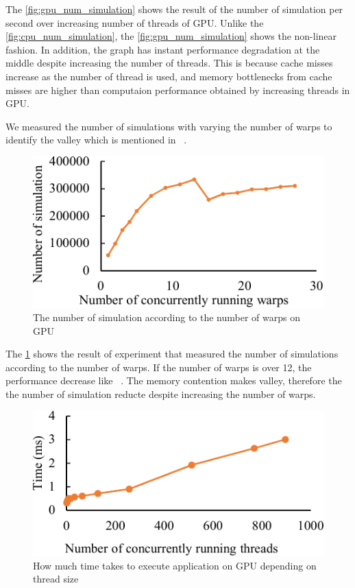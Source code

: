 The \cref{fig:gpu_num_simulation} shows the result of the number of simulation per second over increasing number of threads of GPU. 
Unlike the \cref{fig:cpu_num_simulation}, the \cref{fig:gpu_num_simulation} shows the non-linear fashion. 
In addition, the graph has instant performance degradation at the middle despite increasing the number of threads. 
This is because cache misses increase as the number of thread is used, and memory bottlenecks from cache misses are higher than computaion performance obtained by increasing threads in GPU.

We measured the number of simulations with varying the number of warps to identify the valley which is mentioned in ~\cite{li2015priority_valley}. 
\begin{figure}
\includegraphics[width=0.95\columnwidth]{figures/gpu_warp_simulation.pdf}
\caption{The number of simulation according to the number of warps on GPU}
\label{fig:gpu_warp_simulation}
\end{figure}

The \cref{fig:gpu_warp_simulation} shows the result of experiment that measured the number of simulations according to the number of warps. 
If the number of warps is over 12, the performance decrease like ~\cite{li2015priority_valley}. 
The memory contention makes valley, therefore the the number of simulation reducte despite increasing the number of warps. 

\begin{figure}
\includegraphics[width=0.95\columnwidth]{figures/gpu_thread_time.pdf}
\caption{How much time takes to execute application on GPU depending on thread size}
\label{fig:gpu_thread_time}
\end{figure}

